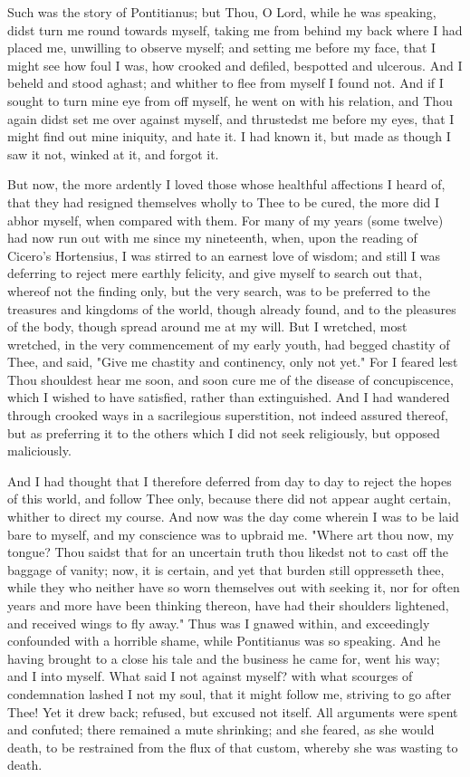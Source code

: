 \documentclass[b5paper,openright,12pt,twoside]{book}
\begin{document}
Such was the story of Pontitianus; but Thou, O Lord, while he was
speaking, didst turn me round towards myself, taking me from behind my
back where I had placed me, unwilling to observe myself; and setting
me before my face, that I might see how foul I was, how crooked and
defiled, bespotted and ulcerous. And I beheld and stood aghast; and
whither to flee from myself I found not. And if I sought to turn mine
eye from off myself, he went on with his relation, and Thou again didst
set me over against myself, and thrustedst me before my eyes, that I
might find out mine iniquity, and hate it. I had known it, but made as
though I saw it not, winked at it, and forgot it.

But now, the more ardently I loved those whose healthful affections I
heard of, that they had resigned themselves wholly to Thee to be cured,
the more did I abhor myself, when compared with them. For many of my
years (some twelve) had now run out with me since my nineteenth, when,
upon the reading of Cicero's Hortensius, I was stirred to an earnest
love of wisdom; and still I was deferring to reject mere earthly
felicity, and give myself to search out that, whereof not the finding
only, but the very search, was to be preferred to the treasures and
kingdoms of the world, though already found, and to the pleasures of the
body, though spread around me at my will. But I wretched, most wretched,
in the very commencement of my early youth, had begged chastity of Thee,
and said, "Give me chastity and continency, only not yet." For I feared
lest Thou shouldest hear me soon, and soon cure me of the disease
of concupiscence, which I wished to have satisfied, rather than
extinguished. And I had wandered through crooked ways in a sacrilegious
superstition, not indeed assured thereof, but as preferring it to the
others which I did not seek religiously, but opposed maliciously.

And I had thought that I therefore deferred from day to day to reject
the hopes of this world, and follow Thee only, because there did not
appear aught certain, whither to direct my course. And now was the day
come wherein I was to be laid bare to myself, and my conscience was
to upbraid me. "Where art thou now, my tongue? Thou saidst that for an
uncertain truth thou likedst not to cast off the baggage of vanity; now,
it is certain, and yet that burden still oppresseth thee, while they who
neither have so worn themselves out with seeking it, nor for often years
and more have been thinking thereon, have had their shoulders lightened,
and received wings to fly away." Thus was I gnawed within, and
exceedingly confounded with a horrible shame, while Pontitianus was so
speaking. And he having brought to a close his tale and the business
he came for, went his way; and I into myself. What said I not against
myself? with what scourges of condemnation lashed I not my soul, that it
might follow me, striving to go after Thee! Yet it drew back; refused,
but excused not itself. All arguments were spent and confuted; there
remained a mute shrinking; and she feared, as she would death, to be
restrained from the flux of that custom, whereby she was wasting to
death.
\end{document}
